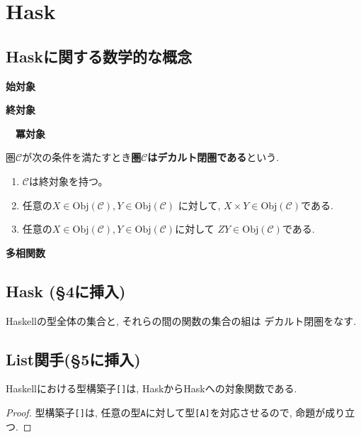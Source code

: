 \section{Hask}
\subsection{Haskに関する数学的な概念}\begin{Def}
{\bf 始対象}
\end{Def}
\begin{Def}
{\bf 終対象}
\end{Def}
\begin{Def}
{\bf　冪対象}
\end{Def}
\begin{Def}
圏$\mathscr{C}$が次の条件を満たすとき{\bf 圏$\mathscr{C}$はデカルト閉圏である}という.
\begin{enumerate}
\item
$\mathscr{C}$は終対象を持つ。
\item
任意の$X\in\mathrm{Obj}(\mathscr{C}),Y\in\mathrm{Obj}(\mathscr{C})$ に対して,
$X\times Y\in\mathrm{Obj}(\mathscr{C})$である.
\item
任意の$X\in\mathrm{Obj}(\mathscr{C}),Y\in\mathrm{Obj}(\mathscr{C})$に対して
$ZY\in\mathrm{Obj}(\mathscr{C})$である.
\end{enumerate}
\end{Def}
\begin{Def}
{\bf 多相関数}
\end{Def}
\subsection{Hask (\S 4に挿入)}

\begin{Prop}
Haskellの型全体の集合と,
それらの間の関数の集合の組は
デカルト閉圏をなす.
\end{Prop}


\subsection{List関手(\S 5に挿入)}



\begin{Prop}
Haskellにおける型構築子\verb|[]|は, HaskからHaskへの対象関数である.
\end{Prop}
\begin{proof}
型構築子\verb|[]|は, 任意の型\verb|A|に対して型\verb|[A]|を対応させるので, 命題が成り立つ.
\end{proof}

